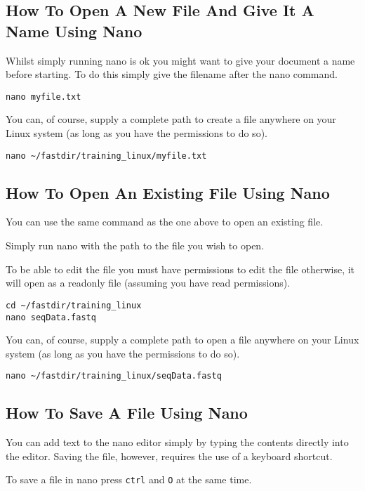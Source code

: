 \subsection{How To Open A New File And Give It A Name Using Nano}
Whilst simply running nano is ok you might want to give your document a name before starting. To do
this simply give the filename after the nano command.
\begin{lstlisting}
nano myfile.txt
\end{lstlisting}

You can, of course, supply a complete path to create a file anywhere on your Linux system (as long
as you have the permissions to do so).
\begin{lstlisting}
nano ~/fastdir/training_linux/myfile.txt
\end{lstlisting}

\subsection{How To Open An Existing File Using Nano}

You can use the same command as the one above to open an existing file.

Simply run nano with the path to the file you wish to open.

To be able to edit the file you must have permissions to edit the file otherwise, it will open as a
readonly file (assuming you have read permissions).

\begin{lstlisting}
cd ~/fastdir/training_linux
nano seqData.fastq
\end{lstlisting}

You can, of course, supply a complete path to open a file anywhere on your Linux system (as long as
you have the permissions to do so).
\begin{lstlisting}
nano ~/fastdir/training_linux/seqData.fastq
\end{lstlisting}

\subsection{How To Save A File Using Nano}
You can add text to the nano editor simply by typing the contents directly into the editor. Saving
the file, however, requires the use of a keyboard shortcut.

To save a file in nano press \texttt{ctrl} and \texttt{O} at the same time.

